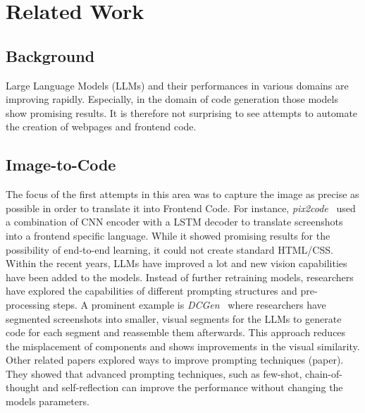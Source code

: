 \chapter{Related Work}\label{chapter:RelatedWork}

\section{Background}
Large Language Models (LLMs) and their performances in various domains are improving 
rapidly. Especially, in the domain of code generation those models show promising results. 
It is therefore not surprising to see attempts to automate the creation of 
webpages and frontend code.

\section{Image-to-Code}
The focus of the first attempts in this area was to capture the image as precise as 
possible in order to translate it into Frontend Code. For instance, \textit{pix2code}~\parencite{beltramelli2017pix2code} 
used a combination of CNN encoder with a LSTM decoder to translate screenshots into 
a frontend specific language. While it showed promising results for the possibility 
of end-to-end learning, it could not create standard HTML/CSS.\newline
Within the recent years, LLMs have improved a lot and new vision capabilities have been 
added to the models. Instead of further retraining models, researchers have 
explored the capabilities of different prompting structures and pre-processing steps. 
A prominent example is
\textit{DCGen}~\parencite{wan2024dcgen} where researchers have segmented screenshots 
into smaller, visual segments for the LLMs to generate code for each segment and reassemble 
them afterwards. This approach reduces the misplacement of components and shows
improvements in the visual similarity.\newline
Other related papers explored ways to improve prompting techniques (paper). They 
showed that advanced prompting techniques, such as few-shot, chain-of-thought and 
self-reflection can improve the performance without changing the models parameters.


